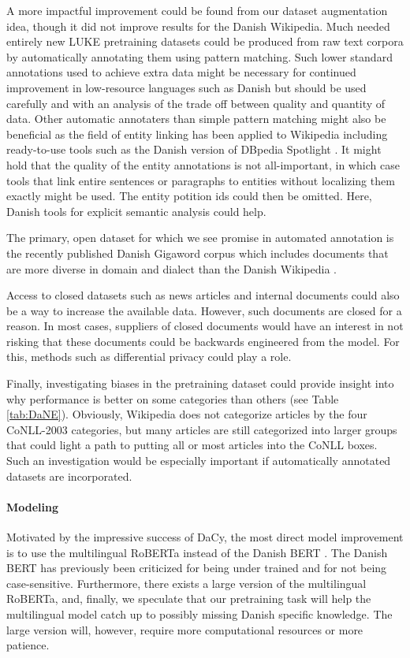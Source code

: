 \documentclass[main.tex]{subfiles}
\begin{document}
A more impactful improvement could be found from our dataset augmentation idea, though it did not improve results for the Danish Wikipedia.
Much needed entirely new LUKE pretraining datasets could be produced from raw text corpora by automatically annotating them using pattern matching.
Such lower standard annotations used to achieve extra data might be necessary for continued improvement in low-resource languages such as Danish but should be used carefully and with an analysis of the trade off between quality and quantity of data.
Other automatic annotaters than simple pattern matching might also be beneficial as the field of entity linking has been applied to Wikipedia \cite{brochier2021wikilink} including ready-to-use tools such as the Danish version of DBpedia Spotlight \cite{isem2013daiber}.
It might hold that the quality of the entity annotations is not all-important, in which case tools that link entire sentences or paragraphs to entities without localizing them exactly might be used.
The entity potition ids could then be omitted.
Here, Danish tools for explicit semantic analysis \cite{hansen2017esa} could help.

The primary, open dataset for which we see promise in automated annotation is the recently published Danish Gigaword corpus which includes documents that are more diverse in domain and dialect than the Danish Wikipedia \cite{derc2021giga}.

Access to closed datasets such as news articles and internal documents could also be a way to increase the available data.
However, such documents are closed for a reason.
In most cases, suppliers of closed documents would have an interest in not risking that these documents could be backwards engineered from the model.
For this, methods such as differential privacy \cite{GONG2020131} could play a role.

Finally, investigating biases in the pretraining dataset could provide insight into why performance is better on some categories than others (see Table \ref{tab:DaNE}).
Obviously, Wikipedia does not categorize articles by the four CoNLL-2003 categories, but many articles are still categorized into larger groups that could light a path to putting all or most articles into the CoNLL boxes.
Such an investigation would be especially important if automatically annotated datasets are incorporated.

\paragraph{Modeling}
Motivated by the impressive success of DaCy, the most direct model improvement is to use the multilingual RoBERTa \cite{conneau2020unsupervised} instead of the Danish BERT \cite{botxo2019dabert}.
The Danish BERT has previously been criticized for being under trained \cite{derc2021giga, nielsen2020textsum} and for not being case-sensitive.
Furthermore, there exists a large version of the multilingual RoBERTa, and, finally, we speculate that our pretraining task will help the multilingual model catch up to possibly missing Danish specific knowledge.
The large version will, however, require more computational resources or more patience.
\end{document}
